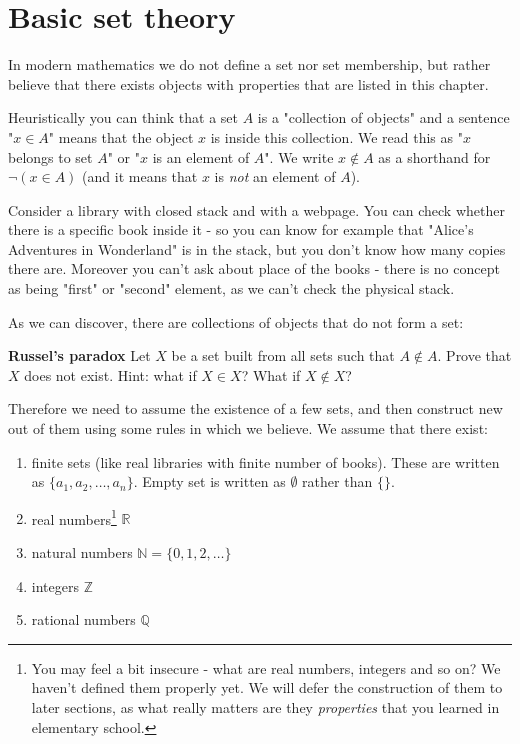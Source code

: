 \section{Basic set theory}
\label{sec:basic_set_theory}

In modern mathematics we do not define a set nor set membership, but rather believe that there exists objects with properties that
are listed in this chapter.

Heuristically you can think that a set $A$ is a "collection of objects" and a sentence "$x\in A$" means that the object $x$ is inside this collection. We read this as
"$x$ belongs to set $A$" or "$x$ is an element of $A$". We write $x\notin A$ as a shorthand for $\neg (x\in A)$ (and it means that $x$ is \textit{not} an element of $A$).

\begin{example}
  Consider a library with closed stack and with a webpage. You can check whether there is a specific book inside it -
  so you can know for example that "Alice's Adventures in Wonderland"
  is in the stack, but you don't know how many copies there are. Moreover you can't ask about place of the books - there is no concept as being "first" or "second" element,
  as we can't check the physical stack.
\end{example}

As we can discover, there are collections of objects that do not form a set:
\begin{prob}
  \textbf{Russel's paradox}
  Let $X$ be a set built from all sets such that $A\notin A.$ Prove that $X$ does not exist. Hint: what if $X\in X$? What if $X\notin X$?
\end{prob}

Therefore we need to assume the existence of a few sets, and then construct new out of them using some rules in which we believe. We assume that there exist:
\begin{enumerate}
  \item finite sets (like real libraries with finite number of books). These are written as $\{a_1,a_2,\dots,a_n\}$. Empty set is written as $\emptyset$ rather than $\{\}$.
	\item real numbers\footnote{You may feel a bit insecure - what are real numbers, integers and so on? We haven't defined them properly yet.
    We will defer the construction of them to later sections, as what really matters are they \textit{properties} that you learned in elementary school.} $\mathbb R$
	\item natural numbers $\mathbb N=\{0,1,2,\dots\}$
	\item integers $\mathbb Z$
	\item rational numbers $\mathbb Q$
\end{enumerate}

